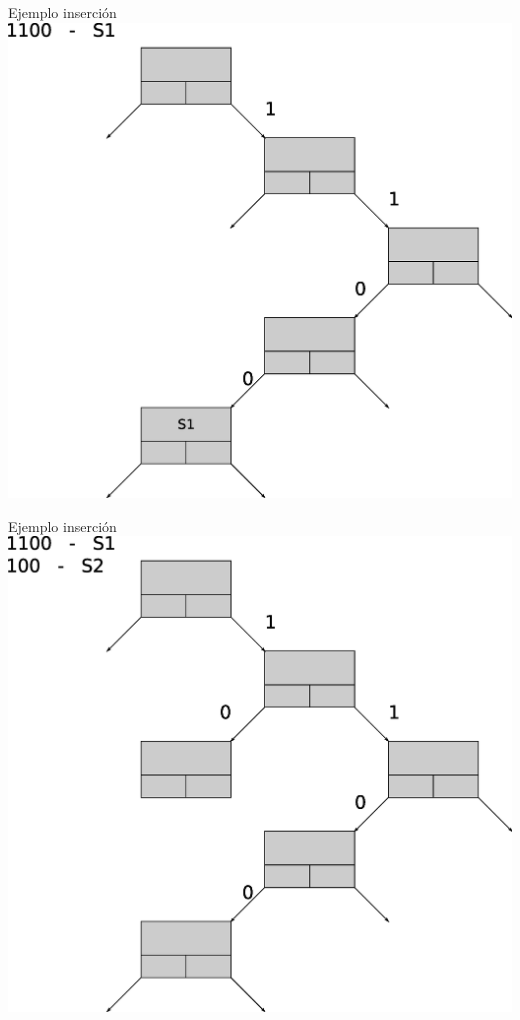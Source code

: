 \documentclass[xcolor=dvipsnames]{beamer}
\begin{document}
\begin{frame}{Ejemplo inserción} 
\center	
\includegraphics[scale=0.30]{figures/lluinsert05.eps} 
\end{frame}

\begin{frame}{Ejemplo inserción} 
\center	
\includegraphics[scale=0.30]{figures/lluinsert06.eps} 
\end{frame}
\end{document}
